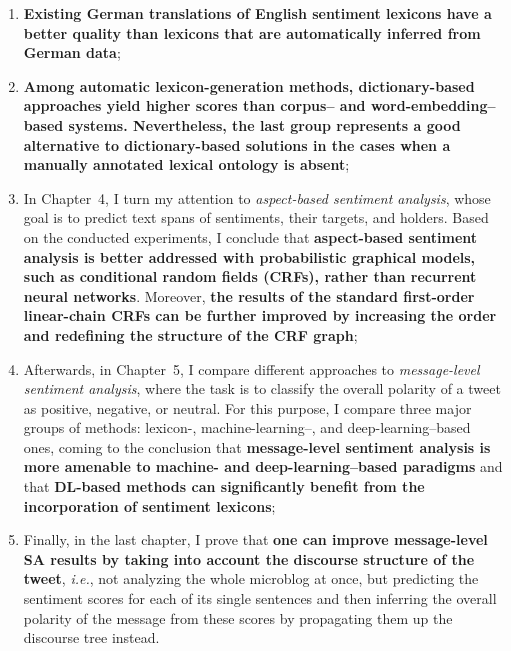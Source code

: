 \documentclass[11pt]{article}
\newcommand{\ienocomma}{\textit{i.e.}}
\newcommand{\ie}{\ienocomma,}
\begin{document}
\begin{enumerate}[resume*]
\item\textbf{Existing German translations of English sentiment
  lexicons have a better quality than lexicons that are automatically
  inferred from German data};

\item\textbf{Among automatic lexicon-generation methods,
  dictionary-based approaches yield higher scores than corpus-- and
  word-embedding--based systems.  Nevertheless, the last group
  represents a good alternative to dictionary-based solutions in the
  cases when a manually annotated lexical ontology is absent};

\item In Chapter~4, I turn my attention to \emph{aspect-based
  sentiment analysis}, whose goal is to predict text spans of
  sentiments, their targets, and holders.  Based on the conducted
  experiments, I conclude that \textbf{aspect-based sentiment analysis
    is better addressed with probabilistic graphical models, such as
    conditional random fields (CRFs), rather than recurrent neural
    networks}.  Moreover, \textbf{the results of the standard
    first-order linear-chain CRFs can be further improved by
    increasing the order and redefining the structure of the CRF
    graph};

\item Afterwards, in Chapter~5, I compare different approaches to
  \emph{message-level sentiment analysis}, where the task is to
  classify the overall polarity of a tweet as positive, negative, or
  neutral.  For this purpose, I compare three major groups of methods:
  lexicon-, machine-learning--, and deep-learning--based ones, coming
  to the conclusion that \textbf{message-level sentiment analysis is
    more amenable to machine- and deep-learning--based paradigms} and
  that \textbf{DL-based methods can significantly benefit from the
    incorporation of sentiment lexicons};

\item Finally, in the last chapter, I prove that \textbf{one can
  improve message-level SA results by taking into account the
  discourse structure of the tweet}, \ie{} not analyzing the whole
  microblog at once, but predicting the sentiment scores for each of
  its single sentences and then inferring the overall polarity of the
  message from these scores by propagating them up the discourse tree
  instead.
\end{enumerate}
\end{document}
